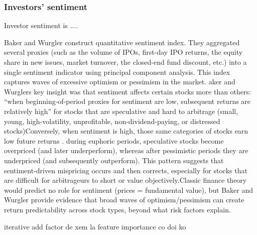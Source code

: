 \subsubsection{Investors' sentiment}

Investor sentiment is ....

Baker and Wurgler construct quantitative sentiment index. They aggregated several proxies (such as the volume of IPOs, first-day IPO returns, the equity share in new issues, market turnover, the closed-end fund discount, etc.) into a single sentiment indicator using principal component analysis. This index captures waves of excessive optimism or pessimism in the market. aker and Wurglers key insight was that sentiment affects certain stocks more than others: “when beginning-of-period proxies for sentiment are low, subsequent returns are relatively high” for stocks that are speculative and hard to arbitrage (small, young, high-volatility, unprofitable, non-dividend-paying, or distressed stocks)Conversely, when sentiment is high, those same categories of stocks earn low future returns . during euphoric periods, speculative stocks become overpriced (and later underperform), whereas after pessimistic periods they are underpriced (and subsequently outperform). This pattern suggests that sentiment-driven mispricing occurs and then corrects, especially for stocks that are difficult for arbitrageurs to short or value objectively.Classic finance theory would predict no role for sentiment (prices = fundamental value), but Baker and Wurgler provide evidence that broad waves of optimism/pessimism can create return predictability across stock types, beyond what risk factors explain.





iterative add factor de xem la feature importance co doi ko 